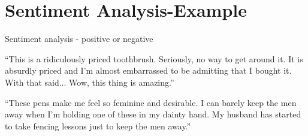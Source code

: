 	\section{Sentiment Analysis-Example}
	\begin{bulletedlist}
		\item Sentiment analysis - positive or negative
		\begin{bulletedlist}
			\item ``This is a ridiculously priced toothbrush.  Seriously, no way to get around it. It is absurdly priced and I'm almost embarrassed to be admitting that I bought it.  With that said... Wow, this thing is amazing.''
			\item ``These pens make me feel so feminine and desirable. I can barely keep the men away when I'm holding one of these in my dainty hand.  My husband has started to take fencing lessons just to keep the men away.''
		\end{bulletedlist}
	\end{bulletedlist}
